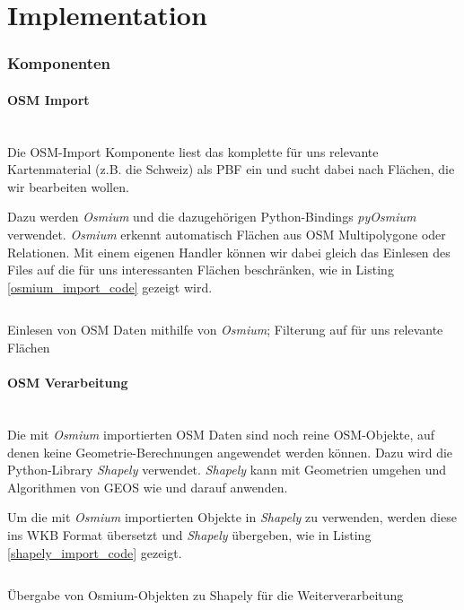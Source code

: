 
\section{Implementation}
\label{sec:Implementation}

\subsubsection{Komponenten}
\label{subsub:impl_Komponenten}

\paragraph{OSM Import}~\\
Die \acs{OSM}-Import Komponente liest das komplette für uns relevante Kartenmaterial (z.B. die Schweiz) als \ac{PBF} ein und sucht dabei nach Flächen, die wir bearbeiten wollen.

Dazu werden \emph{Osmium} und die dazugehörigen Python-Bindings \emph{pyOsmium} verwendet. \emph{Osmium} erkennt automatisch Flächen aus \ac{OSM} Multipolygone oder Relationen. Mit einem eigenen Handler können wir dabei gleich das Einlesen des Files auf die für uns interessanten Flächen beschränken, wie in Listing \ref{osmium_import_code} gezeigt wird.

\begin{listing}[ht]
    \inputminted{python}{projectdoc/listing/osmium_handler.py}
    \caption[Einlesen OSM-Daten mit Osmium]{Einlesen von OSM Daten mithilfe von \emph{Osmium}; Filterung auf für uns relevante Flächen}
    \label{osmium_import_code}
\end{listing}

\paragraph{OSM Verarbeitung}~\\
Die mit \emph{Osmium} importierten \ac{OSM} Daten sind noch reine \ac{OSM}-Objekte, auf denen keine Geometrie-Berechnungen angewendet werden können. Dazu wird die Python-Library \emph{Shapely} verwendet. \emph{Shapely} kann mit Geometrien umgehen und Algorithmen von \ac{GEOS} wie  und  darauf anwenden.

Um die mit \emph{Osmium} importierten Objekte in \emph{Shapely} zu verwenden, werden diese ins \ac{WKB} Format übersetzt und \emph{Shapely} übergeben, wie in Listing \ref{shapely_import_code} gezeigt.

\begin{listing}[ht]
    \inputminted{python}{projectdoc/listing/shapely_import.py}
    \caption[Einlesen OSM Objekte in Shapely]{Übergabe von Osmium-Objekten zu Shapely für die Weiterverarbeitung}
    \label{shapely_import_code}
\end{listing}
